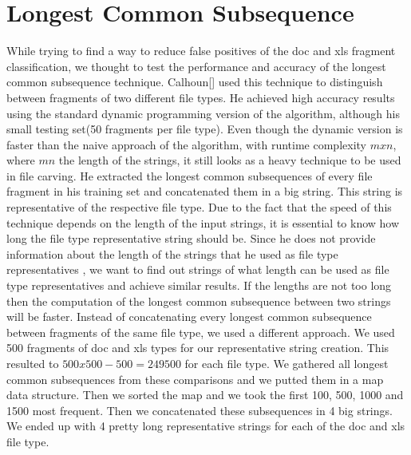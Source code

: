 \section{Longest Common Subsequence}
While trying to find a way to reduce false positives of the doc and xls fragment classification, we thought to test the performance and accuracy of the longest common subsequence technique. Calhoun[] used this technique to distinguish between fragments of two different file types. He achieved high accuracy results using the standard dynamic programming version of the algorithm, although his small testing set(50 fragments per file type). Even though the dynamic version is faster than the naive approach of the algorithm, with runtime complexity $mxn$, where $m n $ the length of the strings, it still looks as a heavy technique to be used in file carving. He extracted the longest common subsequences of every file fragment in his training set and concatenated them in a big string. This string is representative of the respective file type.  Due to the fact that the speed of this technique depends on the length of the input strings, it is essential to know how long the file type representative string should be. Since he does not provide information about the length of the strings that he used as file type representatives , we want to find out strings of what length can be used as file type representatives and achieve similar results. If the lengths are not too long then the computation of the longest common subsequence between two strings will be faster. Instead of concatenating every longest common subsequence between fragments of the same file type, we used a different approach. We used 500 fragments of doc and xls types for our representative string creation. This resulted to $500x500 - 500 = 249500$ for each file type. We gathered all longest common subsequences from these comparisons and we putted them in a map data structure. Then we sorted the map and we took the first 100, 500, 1000 and 1500 most frequent. Then we concatenated these subsequences in 4 big strings. We ended up with 4 pretty long representative strings for each of the doc and xls file type.
 